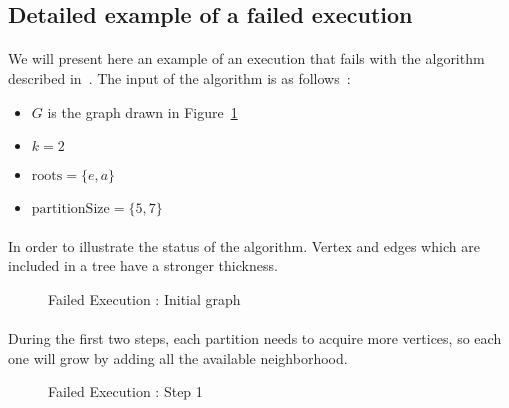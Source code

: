 \label{counter-example}
\subsection{Detailed example of a failed execution}


\paragraph{}
We will present here an example of an execution that fails with the algorithm
described in~\cite{JS94}. The input of the algorithm is as follows~:
\begin{itemize}
\item $G$ is the graph drawn in Figure~\ref{FE_K2_init}
\item $k = 2$
\item $\mathrm{roots} = \{ e, a \}$
\item $\mathrm{partitionSize} = \{ 5, 7\}$
\end{itemize}

\paragraph{}
In order to illustrate the status of the algorithm. Vertex and edges which are
included in a tree have a stronger thickness.

\begin{figure}[H]
  \caption{\label{FE_K2_init}Failed Execution : Initial graph}
  \begin{center}
    \begin{tikzpicture}[scale=0.9,transform shape]
      
    \end{tikzpicture}
  \end{center}
\end{figure}

\paragraph{}
During the first two steps, each partition needs to acquire more vertices, so
each one will grow by adding all the available neighborhood.

\begin{figure}[H]
  \caption{Failed Execution : Step 1}
  \begin{center}
    \begin{tikzpicture}[scale=0.9,transform shape]
      
    \end{tikzpicture}
  \end{center}
\end{figure}

